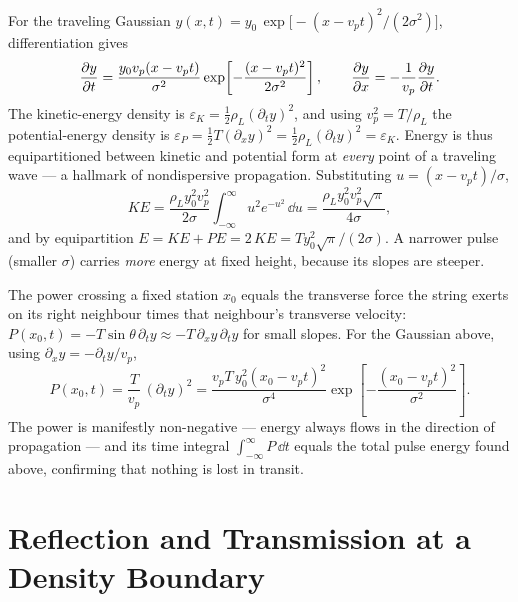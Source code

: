 \begin{example}
For the traveling Gaussian $y(x,t) = y_0\,\exp\!\bigl[-(x-v_p t)^2/(2\sigma^2)\bigr]$, differentiation gives
\begin{equation}
    \pdv{y}{t} = \frac{y_0 v_p (x - v_p t)}{\sigma^2}\exp\!\left[-\frac{(x-v_pt)^2}{2\sigma^2}\right], \qquad \pdv{y}{x} = -\frac{1}{v_p}\pdv{y}{t}.
\end{equation}
The kinetic-energy density is $\varepsilon_K = \tfrac{1}{2}\rho_L(\partial_t y)^2$, and using $v_p^2 = T/\rho_L$ the potential-energy density is $\varepsilon_P = \tfrac{1}{2}T(\partial_x y)^2 = \tfrac{1}{2}\rho_L(\partial_t y)^2 = \varepsilon_K$. Energy is thus equipartitioned between kinetic and potential form at \emph{every} point of a traveling wave --- a hallmark of nondispersive propagation. Substituting $u = (x-v_pt)/\sigma$,
\begin{equation}
    KE = \frac{\rho_L y_0^2 v_p^2}{2\sigma}\int_{-\infty}^{\infty} u^2 e^{-u^2}\,\dd u = \frac{\rho_L y_0^2 v_p^2 \sqrt{\pi}}{4\sigma},
\end{equation}
and by equipartition $E = KE + PE = 2\,KE = T y_0^2\sqrt{\pi}/(2\sigma)$. A narrower pulse (smaller $\sigma$) carries \emph{more} energy at fixed height, because its slopes are steeper.
\end{example}

\begin{example}
The power crossing a fixed station $x_0$ equals the transverse force the string exerts on its right neighbour times that neighbour's transverse velocity: $P(x_0,t) = -T\sin\theta\,\partial_t y \approx -T\,\partial_x y\,\partial_t y$ for small slopes. For the Gaussian above, using $\partial_x y = -\partial_t y/v_p$,
\begin{equation}
    P(x_0,t) = \frac{T}{v_p}\,(\partial_t y)^2 = \frac{v_p T\,y_0^2 (x_0 - v_pt)^2}{\sigma^4}\exp\!\left[-\frac{(x_0-v_pt)^2}{\sigma^2}\right].
\end{equation}
The power is manifestly non-negative --- energy always flows in the direction of propagation --- and its time integral $\int_{-\infty}^{\infty} P\,\dd t$ equals the total pulse energy found above, confirming that nothing is lost in transit.
\end{example}

\section{Reflection and Transmission at a Density Boundary}

